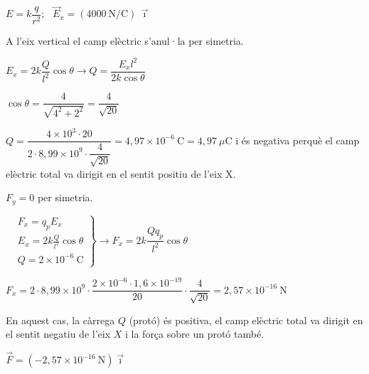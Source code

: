 \begin{solapartat}
\begin{minipage}[t]{0.68\linewidth}
$E = k\dfrac{q}{r^2}$; \ $\vec{E}_x = (4000\ \mathrm{N/C})\,\vec{\imath}$

A l'eix vertical el camp elèctric s'anul·la per simetria.

\medskip
{} $E_x = 2k\dfrac{Q}{l^2}\cos\theta \rightarrow Q = \dfrac{E_x l^2}{2k\cos\theta}$

\medskip
{} $\cos\theta = \dfrac{4}{\sqrt{4^2 + 2^2}} = \dfrac{4}{\sqrt{20}}$
\end{minipage}\hfill
\begin{minipage}[t]{0.28\linewidth}
\vspace{0pt}
\end{minipage}

\medskip
{} $Q = \dfrac{4\times 10^{3}\cdot 20}{2\cdot 8,99\times 10^{9}\cdot\dfrac{4}{\sqrt{20}}} = 4,97\times 10^{-6}\ \mathrm{C} = 4,97\ \mu\mathrm{C}$ i és negativa  perquè el camp elèctric total va dirigit en el sentit positiu de l'eix X.
\end{solapartat}

\begin{solapartat}
 $F_y = 0$ per simetria.

\medskip
{}
$\left.\begin{aligned}
&F_x = q_p E_x\\
&E_x = 2k\frac{Q}{l^2}\cos\theta\\
&Q = 2\times 10^{-6}\ \mathrm{C}
\end{aligned}\right\} \rightarrow F_x = 2k\dfrac{Qq_p}{l^2}\cos\theta$

\medskip
$F_x = 2\cdot 8,99\times 10^{9}\cdot\dfrac{2\times 10^{-6}\cdot 1,6\times 10^{-19}}{20}\cdot\dfrac{4}{\sqrt{20}} = 2,57\times 10^{-16}\ \mathrm{N}$

\medskip
En aquest cas, la càrrega $Q$ (protó) és positiva, el camp elèctric total va dirigit en el sentit negatiu de l'eix $X$ i la força sobre un protó també.

\medskip
{} $\vec{F} = \left(-2,57\times 10^{-16}\ \mathrm{N}\right)\vec{\imath}$
\end{solapartat}
